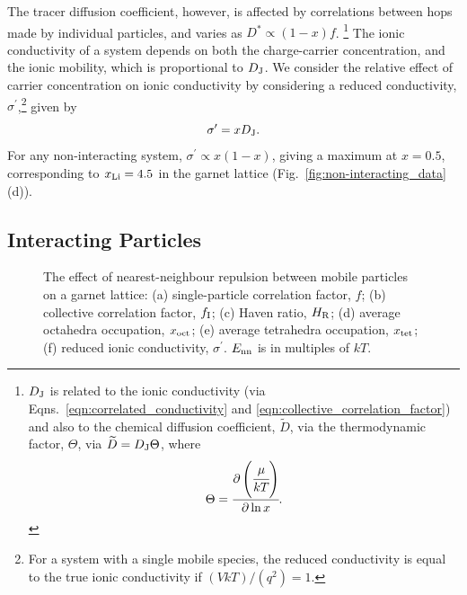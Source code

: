 \documentclass[aps,prb,twocolumn,superscriptaddress,reprint]{revtex4-1}
\newcommand{\xLi}{x_\m{Li}}
\begin{document}
The tracer diffusion coefficient, however, is affected by correlations between hops made by individual particles, and varies as $D^*\propto(1-x)f$. 
\footnote{$D_{\mathrm{J}}$ is related to the ionic conductivity (via Eqns.~\ref{eqn:correlated_conductivity} and \ref{eqn:collective_correlation_factor}) and also to the chemical diffusion coefficient, ${\widetilde{D}}$, via the thermodynamic factor, $\Theta$, via ${\widetilde{D}}=D_{\mathrm{J}}\Theta$, where
\begin{equation}
  \Theta = \cfrac{\partial\left(\cfrac{\mu}{kT}\right)}{\partial \ln x}.
\end{equation}}
The ionic conductivity of a system depends on both the charge-carrier concentration, and the ionic mobility, which is proportional to $D_{\mathrm{J}}$. We consider the relative effect of carrier concentration on ionic conductivity by
considering a reduced conductivity, $\sigma^\prime$,\footnote{For a system with a single mobile species, the reduced conductivity is equal to the true ionic conductivity if $(VkT)/(q^2)=1$.} given by
\begin{equation}
  \label{eqn:reduced_sigma}
  \sigma^\prime = xD_{\mathrm{J}}.
\end{equation}
For any non-interacting system, $\sigma^\prime\propto x\left(1-x\right)$, giving a maximum at $x=0.5$, corresponding to $\xLi=4.5$ in the garnet lattice (Fig.~\ref{fig:non-interacting_data}(d)).

\subsection{Interacting Particles}

\begin{figure}[tb]
  \centering
    \caption{\label{fig:nearest_neighbour_data}The effect of nearest-neighbour repulsion between mobile particles on a garnet lattice: (a) single-particle correlation factor, $f$; (b) collective correlation factor, $f_{\mathrm{I}}$; (c) Haven ratio, $H_{\mathrm{R}}$; (d) average octahedra occupation, $x_{\mathrm{oct}}$; (e) average tetrahedra occupation, $x_{\mathrm{tet}}$; (f) reduced ionic conductivity, $\sigma^\prime$. $E_{\mathrm{nn}}$ is in multiples of $kT$.}
\end{figure}
\end{document}
